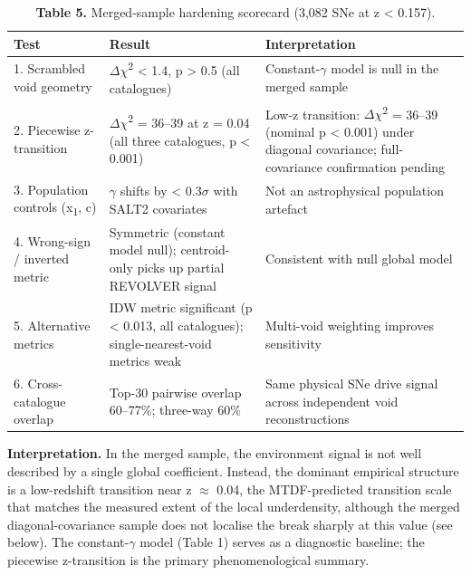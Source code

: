 \documentclass[11pt,a4paper]{article}
\begin{document}
\begin{table}[H]
\centering
\footnotesize
\caption{\textbf{Table 5.} Merged-sample hardening scorecard (3,082 SNe at z < 0.157).}
\begin{tabularx}{\linewidth}{l>{\RaggedRight\arraybackslash}X>{\RaggedRight\arraybackslash}X}
\toprule
\textbf{Test} & \textbf{Result} & \textbf{Interpretation} \tabularnewline
\midrule
1. Scrambled void geometry & $\Delta$$\chi$\textsuperscript{2} < 1.4, p > 0.5 (all catalogues) & Constant-$\gamma$ model is null in the merged sample \tabularnewline
2. Piecewise z-transition & $\Delta$$\chi$\textsuperscript{2} = 36--39 at z = 0.04 (all three catalogues, p < 0.001) & Low-z transition: $\Delta$$\chi$\textsuperscript{2} = 36--39 (nominal p < 0.001) under diagonal covariance; full-covariance confirmation pending \tabularnewline
3. Population controls (x\textsubscript{1}, c) & $\gamma$ shifts by < 0.3$\sigma$ with SALT2 covariates & Not an astrophysical population artefact \tabularnewline
4. Wrong-sign / inverted metric & Symmetric (constant model null); centroid-only picks up partial REVOLVER signal & Consistent with null global model \tabularnewline
5. Alternative metrics & IDW metric significant (p < 0.013, all catalogues); single-nearest-void metrics weak & Multi-void weighting improves sensitivity \tabularnewline
6. Cross-catalogue overlap & Top-30 pairwise overlap 60--77\%; three-way 60\% & Same physical SNe drive signal across independent void reconstructions \tabularnewline
\bottomrule
\end{tabularx}
\end{table}

\textbf{Interpretation.} In the merged sample, the environment signal is not well described by a single global coefficient. Instead, the dominant empirical structure is a low-redshift transition near z $\approx$ 0.04, the MTDF-predicted transition scale that matches the measured extent of the local underdensity, although the merged diagonal-covariance sample does not localise the break sharply at this value (see below). The constant-$\gamma$ model (Table 1) serves as a diagnostic baseline; the piecewise z-transition is the primary phenomenological summary.
\end{document}
